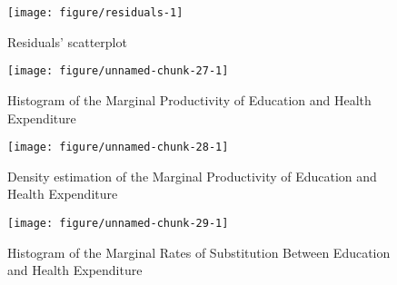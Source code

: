 \documentclass[12pt,a4paper]{article}\usepackage[]{graphicx}\usepackage[]{color}
\makeatletter
\def\maxwidth{ %
  \ifdim\Gin@nat@width>\linewidth
    \linewidth
  \else
    \Gin@nat@width
  \fi
}
\newenvironment{knitrout}{}{} %
\makeatother
\begin{document}
\begin{knitrout}
\color{fgcolor}\begin{figure}[!htbp]

{\centering \texttt{[image: figure/residuals-1]} 

}

\caption[Residuals' scatterplot]{Residuals' scatterplot}\label{fig:residuals}
\end{figure}


\end{knitrout}
\begin{knitrout}
\color{fgcolor}\begin{figure}[htbp]

{\centering \texttt{[image: figure/unnamed-chunk-27-1]} 

}

\caption[Histogram of the Marginal Productivity of Education and Health Expenditure]{Histogram of the Marginal Productivity of Education and Health Expenditure}\label{fig:unnamed-chunk-27}
\end{figure}


\end{knitrout}
\begin{knitrout}
\color{fgcolor}\begin{figure}[htbp]

{\centering \texttt{[image: figure/unnamed-chunk-28-1]} 

}

\caption[Density estimation of the Marginal Productivity of Education and Health Expenditure]{Density estimation of the Marginal Productivity of Education and Health Expenditure}\label{fig:unnamed-chunk-28}
\end{figure}


\end{knitrout}
\begin{knitrout}
\color{fgcolor}\begin{figure}[htbp]

{\centering \texttt{[image: figure/unnamed-chunk-29-1]} 

}

\caption[Histogram of the Marginal Rates of Substitution Between Education and Health Expenditure]{Histogram of the Marginal Rates of Substitution Between Education and Health Expenditure}\label{fig:unnamed-chunk-29}
\end{figure}


\end{knitrout}
\end{document}
